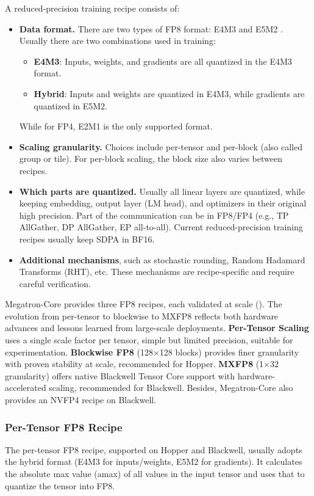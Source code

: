 A reduced-precision training recipe consists of:
\begin{itemize}
    \item \textbf{Data format.} There are two types of FP8 format: E4M3 and E5M2 \cite{micikevicius2022fp8formatsdeeplearning,kuzmin2022fp8quantization}. Usually there are two combinations used in training:
    \begin{itemize}
        \item \textbf{E4M3}: Inputs, weights, and gradients are all quantized in the E4M3 format.
        \item \textbf{Hybrid}: Inputs and weights are quantized in E4M3, while gradients are quantized in E5M2.
    \end{itemize}
    While for FP4, E2M1 is the only supported format.
    \item \textbf{Scaling granularity.} Choices include per-tensor and per-block (also called group or tile). For per-block scaling, the block size also varies between recipes.
    \item \textbf{Which parts are quantized.} Usually all linear layers are quantized, while keeping embedding, output layer (LM head), and optimizers in their original high precision. Part of the communication can be in FP8/FP4 (e.g., TP AllGather, DP AllGather, EP all-to-all). Current reduced-precision training recipes usually keep SDPA in BF16.
    \item \textbf{Additional mechanisms}, such as stochastic rounding, Random Hadamard Transforms (RHT), etc. These mechanisms are recipe-specific and require careful verification. 
\end{itemize}

Megatron-Core provides three FP8 recipes, each validated at scale (). The evolution from per-tensor to blockwise to MXFP8 reflects both hardware advances and lessons learned from large-scale deployments. \textbf{Per-Tensor Scaling} uses a single scale factor per tensor, simple but limited precision, suitable for experimentation. \textbf{Blockwise FP8} (128$\times$128 blocks) provides finer granularity with proven stability at scale, recommended for Hopper. \textbf{MXFP8} (1$\times$32 granularity) offers native Blackwell Tensor Core support with hardware-accelerated scaling, recommended for Blackwell. Besides, Megatron-Core also provides an NVFP4 recipe \cite{nvidia2025pretraininglargelanguagemodels} on Blackwell.

\subsubsection{Per-Tensor FP8 Recipe}
The per-tensor FP8 recipe, supported on Hopper and Blackwell, usually adopts the hybrid format (E4M3 for inputs/weights, E5M2 for gradients). It calculates the absolute max value (amax) of all values in the input tensor and uses that to quantize the tensor into FP8.

